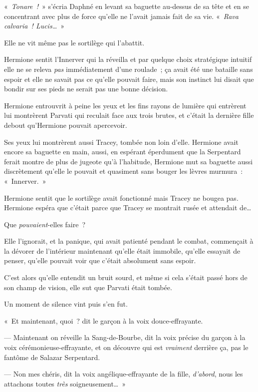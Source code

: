 «~\emph{Tonare~!}~» s'écria Daphné en levant sa baguette au-dessus de sa tête et en se concentrant avec plus de force qu'elle ne l'avait jamais fait de sa vie. «~\emph{Rava calvaria~! Lucis…}~»

Elle ne vit même pas le sortilège qui l'abattit.

\later

Hermione sentit l'Innerver qui la réveilla et par quelque choix stratégique intuitif elle ne se releva \emph{pas} immédiatement d'une roulade~; ça avait été une bataille sans espoir et elle ne savait pas ce qu'elle pouvait faire, mais son instinct lui disait que bondir sur ses pieds ne serait pas une bonne décision.

Hermione entrouvrit à peine les yeux et les fins rayons de lumière qui entrèrent lui montrèrent Parvati qui reculait face aux trois brutes, et c'était la dernière fille debout qu'Hermione pouvait apercevoir.

Ses yeux lui montrèrent aussi Tracey, tombée non loin d'elle. Hermione avait encore sa baguette en main, aussi, en espérant éperdument que la Serpentard ferait montre de plus de jugeote qu'à l'habitude, Hermione mut sa baguette aussi discrètement qu'elle le pouvait et quasiment sans bouger les lèvres murmura~: «~Innerver.~»

Hermione sentit que le sortilège avait fonctionné mais Tracey ne bougea pas. Hermione espéra que c'était parce que Tracey se montrait rusée et attendait de…

Que \emph{pouvaient}-elles faire~?

Elle l'ignorait, et la panique, qui avait patienté pendant le combat, commençait à la dévorer de l'intérieur maintenant qu'elle était immobile, qu'elle essayait de penser, qu'elle pouvait voir que c'était absolument sans espoir.

C'est alors qu'elle entendit un bruit sourd, et même si cela s'était passé hors de son champ de vision, elle sut que Parvati était tombée.

Un moment de silence vint puis s'en fut.

«~Et maintenant, quoi~? dit le garçon à la voix douce-effrayante.

--- Maintenant on réveille la Sang-de-Bourbe, dit la voix précise du garçon à la voix cérémonieuse-effrayante, et on découvre qui est \emph{vraiment} derrière ça, pas le fantôme de Salazar Serpentard.

--- Non mes chéris, dit la voix angélique-effrayante de la fille, \emph{d'abord}, nous les attachons toutes \emph{très} soigneusement…~»

